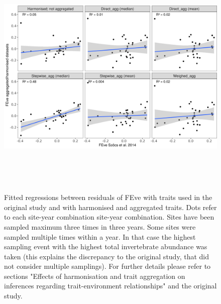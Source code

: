\documentclass[12pt]{article}
\begin{document}
\begin{figure}[ht]
    \centering
    \includegraphics[width=17cm, height=12cm]{Correlation_fd_metrics_FEve.png}
    \caption{Fitted regressions between residuals of FEve with traits used in the original study and with harmonised and aggregated traits. Dots refer to each site-year combination site-year combination. Sites have been sampled maximum three times in three years. Some sites were sampled multiple times within a year. In that case the highest sampling event with the highest total invertebrate abundance was taken (this explains the discrepancy to the original study, that did not consider multiple samplings). For further details please refer to sections "Effects of harmonisation and trait aggregation on inferences regarding trait-environment relationships" and the original study.}
    \label{fig:FEve}
\end{figure}
\end{document}
